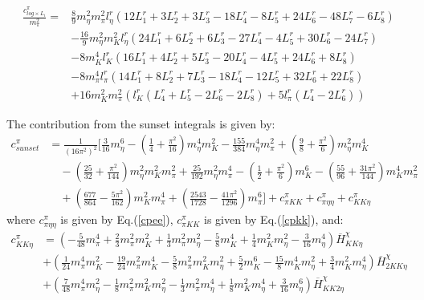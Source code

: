 \documentclass[12pt,a4paper]{article}
\begin{document}
\begin{align}
	\frac{c^{\pi}_{log \times L_{i}}}{m_{\pi}^2} =& \frac{8}{9} m_{\eta}^2 m_{\pi}^2 l^r_{\eta} (12 L^r_{1}+3 L^r_{2}+3 L^r_{3}-18 L^r_{4}-8 L^r_{5}+24 L^r_{6}-48 L^r_{7}-6 L^r_{8}) \nonumber \\
	& -\frac{16}{9} m_{\eta}^2 m_{K}^2 l^r_{\eta} (24 L^r_{1}+6 L^r_{2}+6 L^r_{3}-27 L^r_{4}-4 L^r_{5}+30 L^r_{6}-24 L^r_{7}) \nonumber \\
	& -8 m_{K}^4 l^r_{K} (16 L^r_{1}+4 L^r_{2}+5 L^r_{3}-20 L^r_{4}-4 L^r_{5}+24 L^r_{6}+8 L^r_{8}) \nonumber \\
	& -8 m_{\pi}^4 l^r_{\pi} (14 L^r_{1}+8 L^r_{2}+7 L^r_{3}-18 L^r_{4}-12 L^r_{5}+32 L^r_{6}+22 L^r_{8}) \nonumber \\
	& +16 m_{K}^2 m_{\pi}^2 (l^r_{K} (L^r_{4}+L^r_{5}-2 L^r_{6}-2 L^r_{8})+5 l^r_{\pi} (L^r_{4}-2 L^r_{6}))
\end{align}

The contribution from the sunset integrals is given by:
\begin{align}
	{c}^{\pi}_{sunset} &= \frac{1}{(16\pi^2)^2 } \bigg[ \frac{3}{16} m_{\eta}^6 - \left(\frac{1}{4}+\frac{\pi^2}{16}\right) m_{\eta}^4 m_{K}^2-\frac{155}{384} m_{\eta}^4 m_{\pi}^2 + \left(\frac{9}{8}+\frac{\pi^2}{6}\right) m_{\eta}^2 m_{K}^4 \nonumber \\
	& \quad -\left(\frac{25}{32}+\frac{\pi^2}{144}\right) m_{\eta}^2 m_{K}^2 m_{\pi}^2 + \frac{25}{192} m_{\eta}^2 m_{\pi}^4 - \left(\frac{1}{2}+\frac{\pi^2}{6}\right) m_{K}^6 -\left(\frac{55}{96} + \frac{31 \pi^2}{144}\right) m_{K}^4 m_{\pi}^2 \nonumber \\
	& \quad + \left(\frac{677}{864}-\frac{5\pi^2}{162}\right) m_{K}^2 m_{\pi}^4 + \left( \frac{2543}{1728}-\frac{41\pi^2}{1296} \right) m_{\pi}^6 \bigg] + {c}^{\pi}_{\pi K K} + {c}^{\pi}_{\pi \eta \eta} + {c}^{\pi}_{K K \eta} \label{csunset}
\end{align}
where ${c}^{\pi}_{\pi \eta \eta}$ is given by Eq.(\ref{cpee}), ${c}^{\pi}_{\pi K K}$ is given by Eq.(\ref{cpkk}), and:
\begin{align}
	{c}^{\pi}_{K K \eta} & = \left(-\frac{5}{48} m_{\pi}^4 + \frac{2}{3} m_{\pi}^2 m_{K}^2 + \frac{1}{3} m_{\pi}^2 m_{\eta}^2 - \frac{5}{8} m_{K}^4 + \frac{1}{4} m_{K}^2 m_{\eta}^2 - \frac{3}{16} m_{\eta}^4 \right) \overline{H}^{\chi}_{K K \eta} \nonumber \\
	& + \left( \frac{1}{24} m_{\pi}^4 m_{K}^2 - \frac{19}{24} m_{\pi}^2 m_{K}^4 - \frac{5}{8} m_{\pi}^2 m_{K}^2 m_{\eta}^2 + \frac{5}{2} m_{K}^6 - \frac{15}{8} m_{K}^4 m_{\eta}^2 + \frac{3}{4} m_{K}^2 m_{\eta}^4 \right) \overline{H}^{\chi}_{2K K \eta}  \nonumber \\
	& + \left( \frac{7}{48} m_{\pi}^4 m_{\eta}^2 - \frac{1}{8} m_{\pi}^2 m_{K}^2 m_{\eta}^2 - \frac{1}{3} m_{\pi}^2 m_{\eta}^4 + \frac{1}{8} m_{K}^2 m_{\eta}^4 + \frac{3}{16} m_{\eta}^6 \right) \overline{H}^{\chi}_{K K 2\eta}
\end{align}
\end{document}
